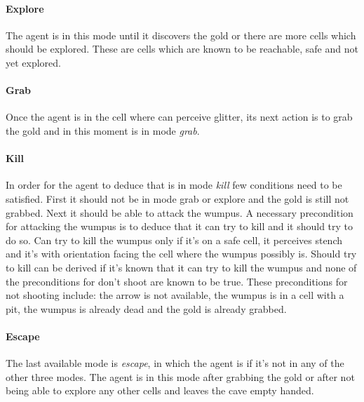 \documentclass{llncs}
\begin{document}
\paragraph{Explore} The agent is in this mode until it discovers the gold or there are more cells which should be explored. These are cells which are known to be reachable, safe and not yet explored. 

\paragraph{Grab} Once the agent is in the cell where can perceive glitter, its next action is to grab the gold and in this moment is in mode \textit{grab}. 

\paragraph{Kill} In order for the agent to deduce that is in mode \textit{kill} few conditions need to be satisfied. First it should not be in mode grab or explore and the gold is still not grabbed. Next it should be able to attack the wumpus. A necessary precondition for attacking the wumpus is to deduce that it can try to kill and it should try to do so. Can try to kill the wumpus only if it's on a safe cell, it perceives stench and it's with orientation facing the cell where the wumpus possibly is. 
Should try to kill can be derived if it's known that it can try to kill the wumpus and none of the preconditions for don't shoot are known to be true. These preconditions for not shooting include: the arrow is not available, the wumpus is in a cell with a pit, the wumpus is already dead and the gold is already grabbed. 

\paragraph{Escape} The last available mode is \textit{escape}, in which the agent is if it's not in any of the other three modes. The agent is in this mode after grabbing the gold or after not being able to explore any other cells and leaves the cave empty handed.


\end{document}
